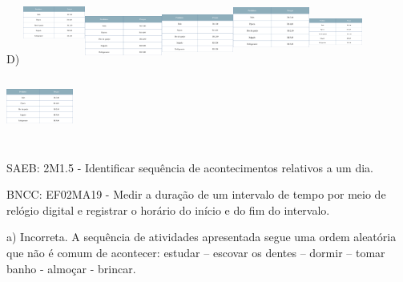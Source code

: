 D)
\includegraphics[width=0.80414in,height=1.05999in]{media/image148.png}\includegraphics[width=1.00005in,height=0.71336in]{media/image148.png}\includegraphics[width=0.92914in,height=0.77678in]{media/image148.png}\includegraphics[width=0.99167in,height=0.93413in]{media/image148.png}\includegraphics[width=0.68193in,height=0.81736in]{media/image148.png}\includegraphics[width=0.86664in,height=1.01803in]{media/image148.png}

SAEB: 2M1.5 - Identificar sequência de acontecimentos relativos a um
dia.

BNCC: EF02MA19 - Medir a duração de um intervalo de tempo por meio de
relógio digital e registrar o horário do início e do fim do intervalo.

a) Incorreta. A sequência de atividades apresentada segue uma ordem
aleatória que não é comum de acontecer: estudar -- escovar os dentes --
dormir -- tomar banho - almoçar - brincar.

